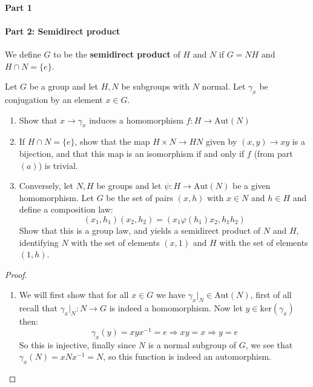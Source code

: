 

\paragraph*{Part 1}


\paragraph*{Part 2: Semidirect product}
We define $G$ to be the \textbf{semidirect product} of $H$ and $N$ if $G=NH$ and $H\cap N = \{e\}$.


\begin{exercise}
    Let $G$ be a group and let $H,N$ be subgroups with $N$ normal. Let $\gamma_x$ be conjugation by an element $x\in G$.\begin{enumerate}[label = (\alph*)]
        \item Show that $x\rightarrow \gamma_x$ induces a homomorphism $f\colon H\rightarrow \text{Aut}(N)$
        \item If $H\cap N = \{e\}$, show that the map $H\times N\rightarrow HN$ given by $(x,y) \rightarrow xy$ is a bijection, and that this map is an isomorphism if and only if $f$ (from part $(a)$) is trivial.
        \item Conversely, let $N,H$ be groups and let $\psi\colon H\rightarrow \text{Aut}(N)$ be a given homomorphism. Let $G$ be the set of pairs $(x,h)$ with $x\in N$ and $h\in H$ and define a composition law:\begin{equation*}
            (x_1,h_1)(x_2,h_2) = ({x_1}{\varphi(h_1)x_2}, h_1h_2)
        \end{equation*}
        Show that this is a group law, and yields a semidirect product of $N$ and $H$, identifying $N$ with the set of elements $(x,1)$ and $H$ with the set of elements $(1,h)$.
    \end{enumerate}
    \begin{proof}
        \begin{enumerate}[label = (\alph*)]
            \item We will first show that for all $x\in G$ we have $\gamma_x|_N\in \text{Aut}(N)$, first of all recall that $\gamma_x|_N\colon N\rightarrow G$ is indeed a homomorphism. Now let $y\in \text{ker}(\gamma_x)$ then:
            \[
                \gamma_x(y) = xyx^{-1} = e \Rightarrow xy = x \Rightarrow y = e
                \]
                So this is injective, finally since $N$ is a normal subgroup of $G$, we see that $\gamma_x(N) = xNx^{-1} = N$, so this function is indeed an automorphism.


\end{enumerate}
\end{proof}
\end{exercise}
